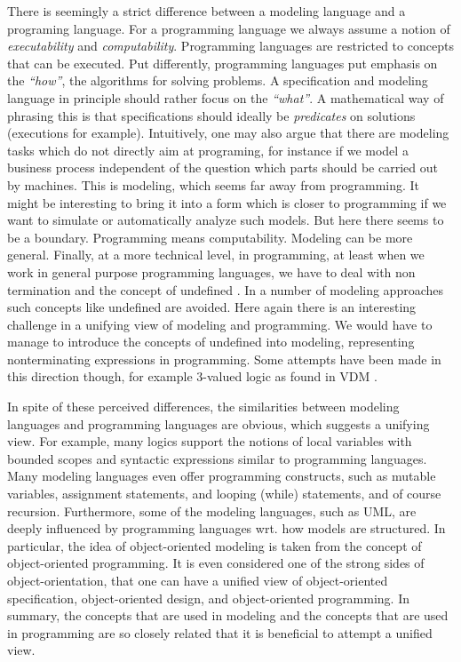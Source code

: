 There is seemingly a strict difference between a modeling
language and a programing language. For a
programming language we always assume a notion of {\em 
executability} and {\em computability}. Programming languages 
are restricted to concepts that can be
executed. Put differently, programming languages put emphasis on 
the {\em ``how''}, the algorithms for solving problems.
A specification and modeling language in principle should rather 
focus on the {\em ``what''}. A mathematical way of phrasing this is 
that specifications should ideally be {\em predicates} on solutions 
(executions for example). Intuitively, one may also argue that 
there are modeling tasks which do not directly aim at programing, 
for instance if we model a business process independent of the 
question which parts should be carried out by machines. This is 
modeling, which seems far away from programming. It might be 
interesting to bring it into a form which is closer to programming 
if we want to simulate or automatically analyze such models. But 
here there seems to be a boundary. Programming means computability. 
Modeling can be more general. Finally, at a more technical level, 
in programming, at least when we work in general purpose 
programming languages, we have to deal with non termination and the 
concept of undefined \cite{broy-chaos-2006}. 
In a number of modeling approaches such 
concepts like undefined are avoided. Here again 
there is an interesting challenge in a unifying
view of modeling and programming. We would have to manage to
introduce the concepts of undefined into modeling, representing
nonterminating expressions in programming.  Some attempts have been
made in	this direction though, for example 3-valued logic as 
found in VDM \cite{jones90}.

In spite of these perceived differences, the similarities between
modeling languages and programming languages are obvious, which
suggests a unifying view. For example, many logics support the 
notions of local variables with bounded scopes and syntactic 
expressions similar to programming languages. Many modeling 
languages even offer programming constructs, such as mutable 
variables, 
assignment statements, and looping (while) statements, and of course recursion. Furthermore, some of the modeling 
languages, such as UML, are deeply influenced by programming 
languages wrt. how models are structured. In particular, the idea 
of object-oriented modeling is taken from the concept of 
object-oriented programming. It is even considered one of the strong sides 
of object-orientation, that one can have a unified view of 
object-oriented specification, object-oriented design, and 
object-oriented programming. In summary, the concepts that 
are used in modeling and the concepts that are used in 
programming are so closely related that it is beneficial to attempt 
a unified view.

